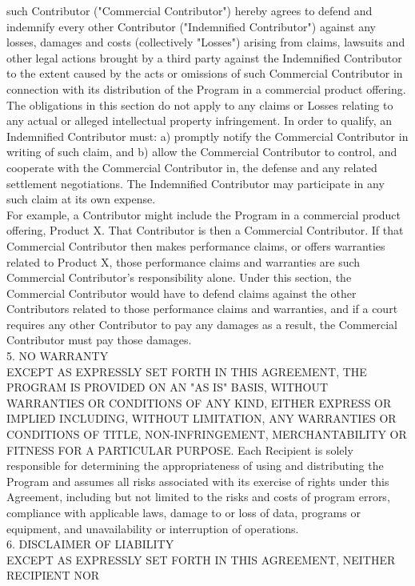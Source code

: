 {such Contributor ("Commercial Contributor") hereby agrees to defend
and indemnify every other Contributor ("Indemnified Contributor")
against any losses, damages and costs (collectively "Losses") arising
from claims, lawsuits and other legal actions brought by a third party
against the Indemnified Contributor to the extent caused by the acts
or omissions of such Commercial Contributor in connection with its
distribution of the Program in a commercial product offering. The
obligations in this section do not apply to any claims or Losses
relating to any actual or alleged intellectual property
infringement. In order to qualify, an Indemnified Contributor must: a)
promptly notify the Commercial Contributor in writing of such claim,
and b) allow the Commercial Contributor to control, and cooperate with
the Commercial Contributor in, the defense and any related settlement
negotiations. The Indemnified Contributor may participate in any such
claim at its own expense.
\\[4pt]
For example, a Contributor might include the Program in a commercial
product offering, Product X. That Contributor is then a Commercial
Contributor. If that Commercial Contributor then makes performance
claims, or offers warranties related to Product X, those performance
claims and warranties are such Commercial Contributor's responsibility
alone. Under this section, the Commercial Contributor would have to
defend claims against the other Contributors related to those
performance claims and warranties, and if a court requires any other
Contributor to pay any damages as a result, the Commercial Contributor
must pay those damages.
\\[4pt]
5. NO WARRANTY
\\[4pt]
EXCEPT AS EXPRESSLY SET FORTH IN THIS AGREEMENT, THE PROGRAM IS
PROVIDED ON AN "AS IS" BASIS, WITHOUT WARRANTIES OR CONDITIONS OF ANY
KIND, EITHER EXPRESS OR IMPLIED INCLUDING, WITHOUT LIMITATION, ANY
WARRANTIES OR CONDITIONS OF TITLE, NON-INFRINGEMENT, MERCHANTABILITY
OR FITNESS FOR A PARTICULAR PURPOSE. Each Recipient is solely
responsible for determining the appropriateness of using and
distributing the Program and assumes all risks associated with its
exercise of rights under this Agreement, including but not limited to
the risks and costs of program errors, compliance with applicable
laws, damage to or loss of data, programs or equipment, and
unavailability or interruption of operations.
\\[4pt]
6. DISCLAIMER OF LIABILITY
\\[4pt]
EXCEPT AS EXPRESSLY SET FORTH IN THIS AGREEMENT, NEITHER RECIPIENT NOR
}
